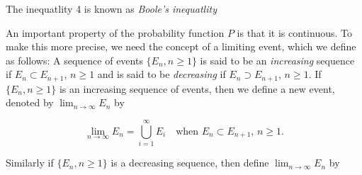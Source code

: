 \documentclass[lang=cn,10pt]{elegantbook}
\begin{document}
The inequatlity 4 is known as \textit{Boole's inequatlity}

An important property of the probability function \( P \) is that it is continuous.
To make this more precise, we need the concept of a limiting event, which we define as follows:
A sequence of events \( \{E_n, n \geq 1\} \) is said to be an \textit{increasing} sequence if \( E_n \subset E_{n+1} \), \( n \geq 1 \) and is said to be \textit{decreasing} if \( E_n \supset E_{n+1} \), \( n \geq 1 \).
If \( \{E_n, n \geq 1\} \) is an increasing sequence of events, then we define a new event, denoted by \( \lim_{n \to \infty} E_n \) by

\[
\lim_{n \to \infty} E_n = \bigcup_{i=1}^{\infty} E_i \quad \text{when } E_n \subset E_{n+1}, \, n \geq 1.
\]

Similarly if \( \{E_n, n \geq 1\} \) is a decreasing sequence, then define \( \lim_{n \to \infty} E_n \) by
\end{document}

